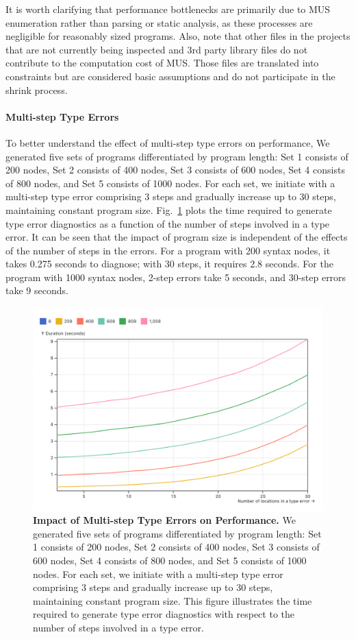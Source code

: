 \documentclass[pdflatex,lineno,sn-nature,Numbered]{sn-jnl}%
\begin{document}
It is worth clarifying that performance bottlenecks are primarily due to MUS enumeration rather than parsing or static analysis, as these processes are negligible for reasonably sized programs. Also, note that other files in the projects that are not currently being inspected and 3rd party library files do not contribute to the computation cost of MUS. Those files are translated into constraints but are considered basic assumptions and do not participate in the shrink process.

\paragraph{Multi-step Type Errors}

To better understand the effect of multi-step type errors on performance,
We generated five sets of programs differentiated by program length: Set 1 consists of 200 nodes, Set 2 consists of 400 nodes, Set 3 consists of 600 nodes, Set 4 consists of 800 nodes, and Set 5 consists of 1000 nodes. For each set, we initiate with a multi-step type error comprising 3 steps and gradually increase up to 30 steps, maintaining constant program size. Fig.~\ref{fig:multi-step-time} plots the time required to generate type error diagnostics as a function of the number of steps involved in a type error.  It can be seen that the impact of program size is independent of the effects of the number of steps in the errors. For a program with 200 syntax nodes, it takes 0.275 seconds to diagnose; with 30 steps, it requires 2.8 seconds. For the program with 1000 syntax nodes, 2-step errors take 5 seconds, and 30-step errors take 9 seconds.

\begin{figure}[ht]
    \centering
    \includegraphics[width=0.8\linewidth]{images/multi-step.png}
    \caption{{\bf Impact of Multi-step Type Errors on Performance.} We generated five sets of programs differentiated by program length: Set 1 consists of 200 nodes, Set 2 consists of 400 nodes, Set 3 consists of 600 nodes, Set 4 consists of 800 nodes, and Set 5 consists of 1000 nodes. For each set, we initiate with a multi-step type error comprising 3 steps and gradually increase up to 30 steps, maintaining constant program size. This figure illustrates the time required to generate type error diagnostics with respect to the number of steps involved in a type error. }
    \label{fig:multi-step-time}
\end{figure}
\end{document}
